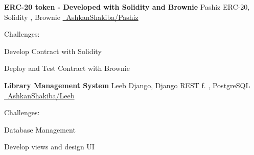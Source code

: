 \documentclass[]{awesome-cv}
\begin{document}
\vspace{-2mm}
\begin{cventries}
	\cventry
	{\textbf{ERC-20 token - Developed with Solidity and Brownie}}
	{Pashiz}
	{ERC-20, Solidity , Brownie}
	{\href{https://github.com/AshkanShakiba/Pashiz}{\faGithub\ AshkanShakiba/Pashiz}}
	{\begin{cvitems}
		\vspace{1mm}
		\item[] {\hspace{-9mm} Challenges:}
		\vspace{1mm}
		\item {Develop Contract with Solidity}
		\vspace{1mm}
		\item {Deploy and Test Contract with Brownie}
	\end{cvitems}}
	\vspace{0mm}
	\cventry
	{\textbf{Library Management System}}
	{Leeb}
	{Django, Django REST f. , PostgreSQL}
	{\href{https://github.com/AshkanShakiba/Leeb}{\faGithub\ AshkanShakiba/Leeb}}
	{\begin{cvitems}
		\vspace{1mm}
		\item[] {\hspace{-9mm} Challenges:}
		\vspace{1mm}
		\item {Database Management}
		\vspace{1mm}
		\item {Develop views and design UI}

\end{cvitems}}
\end{cventries}
\end{document}
